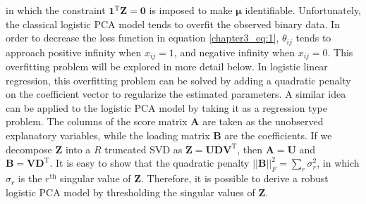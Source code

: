 in which the constraint $\mathbf{1}^{\text{T}}\mathbf{Z} = \mathbf{0}$ is imposed to make $\bm{\mu}$ identifiable. Unfortunately, the classical logistic PCA model tends to overfit the observed binary data. In order to decrease the loss function in equation \ref{chapter3_eq:1}, $\theta_{ij}$ tends to approach positive infinity when $x_{ij}=1$, and negative infinity when $x_{ij} = 0$. This overfitting problem will be explored in more detail below. In logistic linear regression, this overfitting problem can be solved by adding a quadratic penalty on the coefficient vector to regularize the estimated parameters. A similar idea can be applied to the logistic PCA model by taking it as a regression type problem. The columns of the score matrix $\mathbf{A}$ are taken as the unobserved explanatory variables, while the loading matrix $\mathbf{B}$ are the coefficients. If we decompose $\mathbf{Z}$ into a $R$ truncated SVD as $\mathbf{Z}=\mathbf{UDV}^{\text{T}}$, then $\mathbf{A}=\mathbf{U}$ and $\mathbf{B}=\mathbf{VD}^{\text{T}}$. It is easy to show that the quadratic penalty $||\mathbf{B}||_F^2 = \sum_{r} \sigma_{r}^2$, in which $\sigma_{r}$ is the $r^{\text{th}}$ singular value of $\mathbf{Z}$. Therefore, it is possible to derive a robust logistic PCA model by thresholding the singular values of $\mathbf{Z}$.

